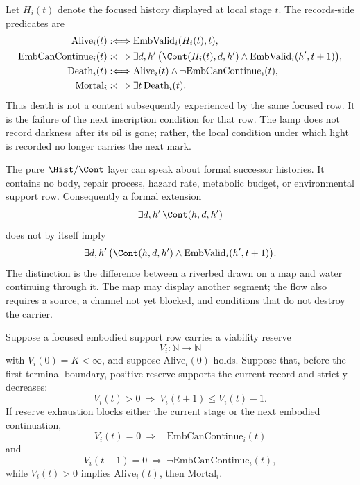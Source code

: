 \begin{definition}
\label{def:consciousness-universe-alive-embodied-death}
Let $H_i(t)$ denote the focused history displayed at local stage $t$. The records-side predicates are
$$
\begin{aligned}
\mathrm{Alive}_i(t)
&:\Longleftrightarrow \mathrm{EmbValid}_i(H_i(t),t),\\
\mathrm{EmbCanContinue}_i(t)
&:\Longleftrightarrow
\exists d,h'\,
\bigl(\Cont(H_i(t),d,h')\wedge \mathrm{EmbValid}_i(h',t+1)\bigr),\\
\mathrm{Death}_i(t)
&:\Longleftrightarrow
\mathrm{Alive}_i(t)\wedge \neg \mathrm{EmbCanContinue}_i(t),\\
\mathrm{Mortal}_i
&:\Longleftrightarrow
\exists t\,\mathrm{Death}_i(t).
\end{aligned}
$$
Thus death is not a content subsequently experienced by the same focused row. It is the failure of the next inscription condition for that row. The lamp does not record darkness after its oil is gone; rather, the local condition under which light is recorded no longer carries the next mark.
\end{definition}

\begin{principle}
\label{prin:consciousness-universe-formal-not-embodied-continuation}
The pure $\Hist/\Cont$ layer can speak about formal successor histories. It contains no body, repair process, hazard rate, metabolic budget, or environmental support row. Consequently a formal extension
$$
\exists d,h'\,\Cont(h,d,h')
$$
does not by itself imply
$$
\exists d,h'\,\bigl(\Cont(h,d,h')\wedge \mathrm{EmbValid}_i(h',t+1)\bigr).
$$
The distinction is the difference between a riverbed drawn on a map and water continuing through it. The map may display another segment; the flow also requires a source, a channel not yet blocked, and conditions that do not destroy the carrier.
\end{principle}

\begin{theorem}
\label{thm:consciousness-universe-finite-reserve-mortality}
Suppose a focused embodied support row carries a viability reserve
$$
V_i:\mathbb{N}\to\mathbb{N}
$$
with $V_i(0)=K<\infty$, and suppose $\mathrm{Alive}_i(0)$ holds. Suppose that, before the first terminal boundary, positive reserve supports the current record and strictly decreases:
$$
V_i(t)>0\ \Longrightarrow\ V_i(t+1)\le V_i(t)-1.
$$
If reserve exhaustion blocks either the current stage or the next embodied continuation,
$$
V_i(t)=0\ \Longrightarrow\ \neg\mathrm{EmbCanContinue}_i(t)
$$
and
$$
V_i(t+1)=0\ \Longrightarrow\ \neg\mathrm{EmbCanContinue}_i(t),
$$
while $V_i(t)>0$ implies $\mathrm{Alive}_i(t)$, then $\mathrm{Mortal}_i$.
\end{theorem}

